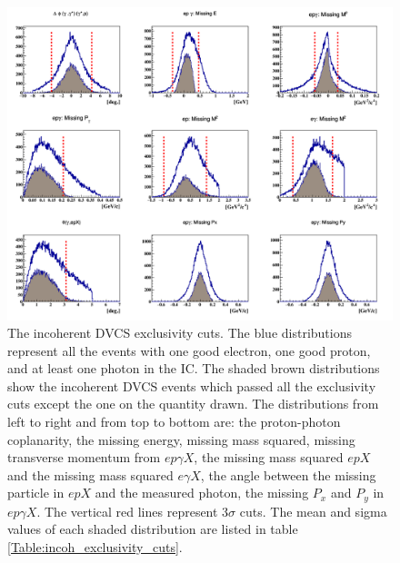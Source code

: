 \begin{figure}[h!]
\centering
\includegraphics[scale=0.4]{fig_dvcs/all_incoh_exc_cuts.png}
\caption{The incoherent DVCS exclusivity cuts. The blue distributions represent 
   all the events with one good electron, one good proton, and at least one 
   photon in the IC. The shaded brown distributions show the incoherent DVCS 
   events which passed all the exclusivity cuts except the one on the quantity 
   drawn. The distributions from left to right and from top to bottom are: the 
   proton-photon coplanarity, the missing energy, missing mass squared, missing 
   transverse momentum from $ep\gamma X$, the missing mass squared $epX$ and 
   the missing mass squared $e\gamma X$, the angle between the missing particle 
   in $epX$ and the measured photon, the missing $P_{x}$ and $P_{y}$ in 
   $ep\gamma X$. The vertical red lines represent 3$\sigma$ cuts. The mean and 
   sigma values of each shaded distribution are listed in table 
\ref{Table:incoh_exclusivity_cuts}.} \label{fig:incoh_exclusivty_cuts}
\end{figure}

